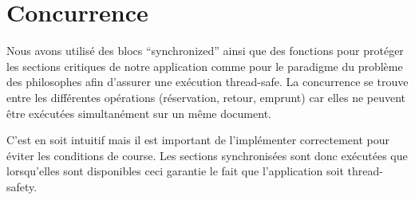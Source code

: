 \chapter*{Concurrence}

    Nous avons utilisé des blocs “synchronized” ainsi que des fonctions pour protéger les sections critiques de notre application comme pour le
    paradigme du problème des philosophes afin d’assurer une exécution thread-safe. La concurrence se trouve entre les
    différentes opérations (réservation, retour, emprunt) car elles ne peuvent être exécutées simultanément sur un même document.

    \bigskip

    C’est en soit intuitif mais il est important de l’implémenter correctement pour éviter les conditions de course.
    Les sections synchronisées sont donc exécutées que lorsqu’elles sont disponibles ceci garantie le fait que l’application
    soit thread-safety.

    \bigskip

